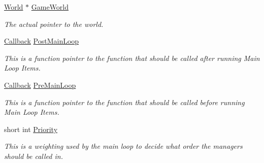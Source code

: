 \begin{DoxyCompactItemize}
\item 
\hypertarget{classMezzanine_1_1ManagerBase_a3590a02f8319f60d9a4ea5a798825df2}{
\hyperlink{classMezzanine_1_1World}{World} $\ast$ \hyperlink{classMezzanine_1_1ManagerBase_a3590a02f8319f60d9a4ea5a798825df2}{GameWorld}}
\label{classMezzanine_1_1ManagerBase_a3590a02f8319f60d9a4ea5a798825df2}

\begin{DoxyCompactList}\small\item\em The actual pointer to the world. \item\end{DoxyCompactList}\item 
\hypertarget{classMezzanine_1_1ManagerBase_ab27f3f7458b9a6f2a08974d096125ed5}{
\hyperlink{classMezzanine_1_1ManagerBase_ab23a9aa27c4e3cb58d902a149d3c6de2}{Callback} \hyperlink{classMezzanine_1_1ManagerBase_ab27f3f7458b9a6f2a08974d096125ed5}{PostMainLoop}}
\label{classMezzanine_1_1ManagerBase_ab27f3f7458b9a6f2a08974d096125ed5}

\begin{DoxyCompactList}\small\item\em This is a function pointer to the function that should be called after running Main Loop Items. \item\end{DoxyCompactList}\item 
\hypertarget{classMezzanine_1_1ManagerBase_a1652110258237bc313a02757229d0f47}{
\hyperlink{classMezzanine_1_1ManagerBase_ab23a9aa27c4e3cb58d902a149d3c6de2}{Callback} \hyperlink{classMezzanine_1_1ManagerBase_a1652110258237bc313a02757229d0f47}{PreMainLoop}}
\label{classMezzanine_1_1ManagerBase_a1652110258237bc313a02757229d0f47}

\begin{DoxyCompactList}\small\item\em This is a function pointer to the function that should be called before running Main Loop Items. \item\end{DoxyCompactList}\item 
short int \hyperlink{classMezzanine_1_1ManagerBase_a96fb02bf2f4e8b4afe70dedd0d8c6ac9}{Priority}
\begin{DoxyCompactList}\small\item\em This is a weighting used by the main loop to decide what order the managers should be called in. \item\end{DoxyCompactList}\end{DoxyCompactItemize}



